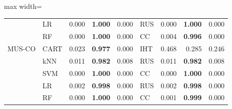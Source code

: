 \begin{table}[!htbp]
\begin{adjustbox}{max width=\linewidth}
\begin{tabular}{llrrrlrrr}
 & LR & 0.000 & \textbf{1.000} & 0.000 & RUS & 0.000 & \textbf{1.000} & 0.000 \\
 & RF & 0.000 & \textbf{1.000} & 0.000 & CC & 0.004 & \textbf{0.996} & 0.000 \\
\midrule
MUS-CO & CART & 0.023 & \textbf{0.977} & 0.000 & IHT & 0.468 & 0.285 & 0.246 \\
 & kNN & 0.011 & \textbf{0.982} & 0.008 & RUS & 0.011 & \textbf{0.982} & 0.008 \\
 & SVM & 0.000 & \textbf{1.000} & 0.000 & CC & 0.000 & \textbf{1.000} & 0.000 \\
 & LR & 0.002 & \textbf{0.998} & 0.000 & RUS & 0.002 & \textbf{0.998} & 0.000 \\
 & RF & 0.000 & \textbf{1.000} & 0.000 & CC & 0.001 & \textbf{0.999} & 0.000 \\
\bottomrule
\end{tabular}
\end{adjustbox}
\end{table}

